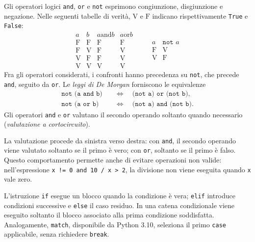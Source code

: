 Gli operatori logici \texttt{and}, \texttt{or} e \texttt{not} esprimono
congiunzione, disgiunzione e negazione. Nelle seguenti tabelle di verità,
\(\mathrm{V}\) e \(\mathrm{F}\) indicano rispettivamente
\texttt{True} e \texttt{False}:
\[
\begin{array}{cc|cc}
  a & b & a\mathbin{\texttt{ and }}b & a\mathbin{\texttt{ or }}b\\
  \hline
  \mathrm{F} & \mathrm{F} & \mathrm{F} & \mathrm{F}\\
  \mathrm{F} & \mathrm{V} & \mathrm{F} & \mathrm{V}\\
  \mathrm{V} & \mathrm{F} & \mathrm{F} & \mathrm{V}\\
  \mathrm{V} & \mathrm{V} & \mathrm{V} & \mathrm{V}
\end{array}
\qquad
\begin{array}{c|c}
  a & \texttt{not }a\\
  \hline
  \mathrm{F} & \mathrm{V}\\
  \mathrm{V} & \mathrm{F}
\end{array}
\]
Fra gli operatori considerati, i confronti hanno precedenza su
\texttt{not}, che precede \texttt{and}, seguito da \texttt{or}.
Le \emph{leggi di De Morgan} forniscono le equivalenze
\[
\begin{aligned}
 \texttt{not (a and b)}&\quad\Longleftrightarrow\quad
 \texttt{(not a) or (not b)},\\
 \texttt{not (a or b)}&\quad\Longleftrightarrow\quad
 \texttt{(not a) and (not b)}.
\end{aligned}
\]
Gli operatori \texttt{and} e \texttt{or} valutano il secondo operando
soltanto quando necessario (\emph{valutazione a cortocircuito}).

La valutazione procede da sinistra verso destra: con \texttt{and}, il
secondo operando viene valutato soltanto se il primo è vero; con
\texttt{or}, soltanto se il primo è falso. Questo comportamento permette
anche di evitare operazioni non valide: nell'espressione
\lstinline|x != 0 and 10 / x > 2|, la divisione non viene eseguita
quando \texttt{x} vale zero.

L'istruzione \texttt{if} esegue un blocco quando la condizione è vera;
\texttt{elif} introduce condizioni successive e \texttt{else} il caso
residuo. In una catena condizionale viene eseguito soltanto il blocco
associato alla prima condizione soddisfatta. Analogamente, \texttt{match},
disponibile da Python 3.10, seleziona il primo \texttt{case} applicabile,
senza richiedere \texttt{break}.


